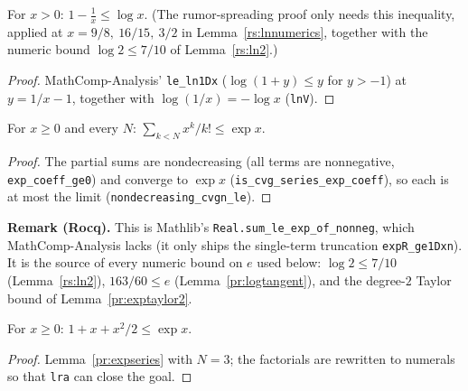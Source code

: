 \begin{lemma}\label{pr:logbounds}
  \rocqok
  For $x > 0$: $1 - \tfrac1x \le \log x$. (The rumor-spreading proof only
  needs this inequality, applied at $x = 9/8,\ 16/15,\ 3/2$
  in Lemma~\ref{rs:lnnumerics}, together with the numeric bound
  $\log 2 \le 7/10$ of Lemma~\ref{rs:ln2}.)
\end{lemma}
\begin{proof}
  \rocqok
  MathComp-Analysis' \texttt{le\_ln1Dx} ($\log(1 + y) \le y$ for $y > -1$)
  at $y = 1/x - 1$, together with $\log(1/x) = -\log x$ (\texttt{lnV}).
\end{proof}

\begin{lemma}\label{pr:expseries}
  \rocqok
  For $x \ge 0$ and every $N$: $\sum_{k < N} x^k/k! \le \exp x$.
\end{lemma}
\begin{proof}
  \rocqok
  The partial sums are nondecreasing (all terms are nonnegative,
  \texttt{exp\_coeff\_ge0}) and converge to $\exp x$
  (\texttt{is\_cvg\_series\_exp\_coeff}), so each is at most the limit
  (\texttt{nondecreasing\_cvgn\_le}).
\end{proof}

\noindent\textbf{Remark (Rocq).} This is Mathlib's
\texttt{Real.sum\_le\_exp\_of\_nonneg}, which MathComp-Analysis lacks (it
only ships the single-term truncation \texttt{expR\_ge1Dxn}). It is the
source of every numeric bound on $e$ used below: $\log 2 \le 7/10$
(Lemma~\ref{rs:ln2}), $163/60 \le e$ (Lemma~\ref{pr:logtangent}), and the
degree-$2$ Taylor bound of Lemma~\ref{pr:exptaylor2}.

\begin{lemma}\label{pr:exptaylor2}
  \rocqok
  For $x \ge 0$: $1 + x + x^2/2 \le \exp x$.
\end{lemma}
\begin{proof}
  \rocqok
  Lemma~\ref{pr:expseries} with $N = 3$; the factorials are rewritten to
  numerals so that \texttt{lra} can close the goal.
\end{proof}

